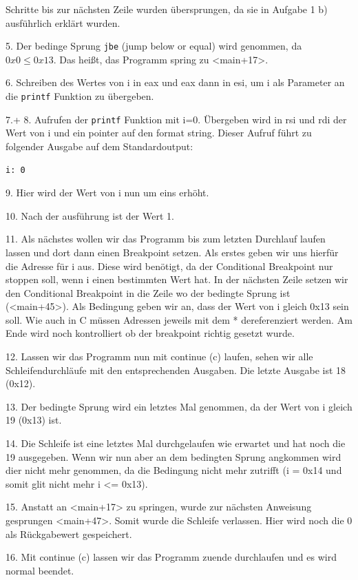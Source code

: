 \documentclass[12pt]{article}
\begin{document}
Schritte bis zur nächsten Zeile wurden übersprungen, da sie in Aufgabe 1 b) ausführlich erklärt wurden.


5. Der bedinge Sprung \texttt{jbe} (jump below or equal) wird genommen, da $ 0x0 \le 0x13$. Das heißt, das Programm spring zu <main+17>.


6. Schreiben des Wertes von i in eax und eax dann in esi, um i als Parameter an die \texttt{printf} Funktion zu übergeben.


7.+ 8. Aufrufen der \texttt{printf} Funktion mit i=0. Übergeben wird in rsi und rdi der Wert von i und ein pointer auf den format string. Dieser Aufruf führt zu folgender Ausgabe auf dem Standardoutput:

\begin{lstlisting}
i: 0
\end{lstlisting}


9. Hier wird der Wert von i nun um eins erhöht.


10. Nach der ausführung ist der Wert 1.


11. Als nächstes wollen wir das Programm bis zum letzten Durchlauf laufen lassen und dort dann einen Breakpoint setzen. Als erstes geben wir uns hierfür die Adresse für i aus. Diese wird benötigt, da der Conditional Breakpoint nur stoppen soll, wenn i einen bestimmten Wert hat. In der nächsten Zeile setzen wir den Conditional Breakpoint in die Zeile wo der bedingte Sprung ist (<main+45>). Als Bedingung geben wir an, dass der Wert von i gleich 0x13 sein soll. Wie auch in C müssen Adressen jeweils mit dem * dereferenziert werden. Am Ende wird noch kontrolliert ob der breakpoint richtig gesetzt wurde.


12. Lassen wir das Programm nun mit continue (c) laufen, sehen wir alle Schleifendurchläufe mit den entsprechenden Ausgaben. Die letzte Ausgabe ist 18 (0x12).


13. Der bedingte Sprung wird ein letztes Mal genommen, da der Wert von i gleich 19 (0x13) ist.


14. Die Schleife ist eine letztes Mal durchgelaufen wie erwartet und hat noch die 19 ausgegeben. Wenn wir nun aber an dem bedingten Sprung angkommen wird dier nicht mehr genommen, da die Bedingung nicht mehr zutrifft (i = 0x14 und somit glit nicht mehr i <= 0x13).


15. Anstatt an <main+17> zu springen, wurde zur nächsten Anweisung gesprungen <main+47>. Somit wurde die Schleife verlassen. Hier wird noch die 0 als Rückgabewert gespeichert. 


16. Mit continue (c) lassen wir das Programm zuende durchlaufen und es wird normal beendet.
\end{document}
